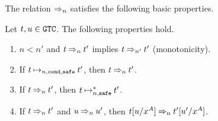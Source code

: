 The relation $\mathbin{\Rightarrow_{n}}$ satisfies the following basic properties. 
\begin{lemma}\label{lem:parallel_basic}
  Let $t, u\in {\tt GTC}$. The following properties hold. 
  \begin{enumerate}
  \item\label{lem:parallel_basic1}
    $n < n'$ and $t \mathbin{\Rightarrow_{n}} t'$ implies $t \mathbin{\Rightarrow_{n'}} t'$ (monotonicity). 
  \item\label{lem:parallel_basic2}
    If $t \mathbin{\mathbin{\mapsto}_{n,{\tt cond},{\hbox{\scriptsize \tt safe}}}} t'$, then $t \mathbin{\Rightarrow_{n}} t'$. 
  \item\label{lem:parallel_basic3}
    If $t \mathbin{\Rightarrow_{n}} t'$, then $t \mathbin{\mathbin{\mapsto}_{n,{\hbox{\scriptsize \tt safe}}}^*} t'$.
  \item\label{lem:parallel_basic4}
    If $t \mathbin{\Rightarrow_{n}} t'$ and $u \mathbin{\Rightarrow_{n}} u'$, 
    then $t[u/x^A] \mathbin{\Rightarrow_{n}} t'[u'/x^A]$.
  \end{enumerate}
\end{lemma}

